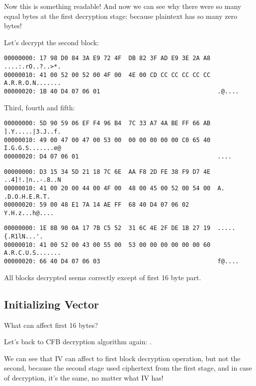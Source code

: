 Now this is something readable!
And now we can see why there were so many equal bytes at the first decryption stage:
because plaintext has so many zero bytes!

Let's decrypt the second block:

\begin{lstlisting}
00000000: 17 98 D0 84 3A E9 72 4F  DB 82 3F AD E9 3E 2A A8  ....:.rO..?..>*.
00000010: 41 00 52 00 52 00 4F 00  4E 00 CD CC CC CC CC CC  A.R.R.O.N.......
00000020: 1B 40 D4 07 06 01                                 .@....
\end{lstlisting}

Third, fourth and fifth:

\begin{lstlisting}
00000000: 5D 90 59 06 EF F4 96 B4  7C 33 A7 4A BE FF 66 AB  ].Y.....|3.J..f.
00000010: 49 00 47 00 47 00 53 00  00 00 00 00 00 C0 65 40  I.G.G.S.......e@
00000020: D4 07 06 01                                       ....
\end{lstlisting}

\begin{lstlisting}
00000000: D3 15 34 5D 21 18 7C 6E  AA F8 2D FE 38 F9 D7 4E  ..4]!.|n..-.8..N
00000010: 41 00 20 00 44 00 4F 00  48 00 45 00 52 00 54 00  A. .D.O.H.E.R.T.
00000020: 59 00 48 E1 7A 14 AE FF  68 40 D4 07 06 02        Y.H.z...h@....
\end{lstlisting}

\begin{lstlisting}
00000000: 1E 8B 90 0A 17 7B C5 52  31 6C 4E 2F DE 1B 27 19  .....{.R1lN...'.
00000010: 41 00 52 00 43 00 55 00  53 00 00 00 00 00 00 60  A.R.C.U.S.......
00000020: 66 40 D4 07 06 03                                 f@....
\end{lstlisting}

All blocks decrypted seems correctly except of first 16 byte part.

\subsection{Initializing Vector}

What can affect first 16 bytes?

Let's back to CFB decryption algorithm again: .

We can see that IV can affect to first block decryption operation, but not the second,
because the second stage used ciphertext from the first stage, and in case of decryption,
it's the same, no matter what IV has!

